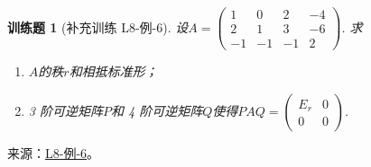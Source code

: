 \documentclass[UTF8,12pt,a4paper,fontset=fandol]{ctexart}
\newtheorem{exercise}{训练题}[section]
\begin{document}
\begin{exercise}[补充训练 L8-例-6]\label{prob:L8-例-6}
设$A=\begin{pmatrix}
            1 & 0 & 2 & -4 \\ 2 & 1 & 3 & -6 \\ -1 & -1 & -1 & 2
        \end{pmatrix}$. 求
    \begin{enumerate}[label=(\arabic*)]
        \item $A$的秩$r$和相抵标准形；

        \item
              3 阶可逆矩阵$P$和 4 阶可逆矩阵$Q$使得$PAQ=\begin{pmatrix}
                      E_r & 0 \\ 0 & 0
                  \end{pmatrix}$.
    \end{enumerate}
\end{exercise}
\noindent 来源：\href{https://github.com/yhwu-is/Linear-Algebra-Left-Undone/blob/new/%E8%AE%B2%E4%B9%89/%E4%B8%93%E9%A2%98/8%20%E7%9B%B8%E6%8A%B5%E6%A0%87%E5%87%86%E5%BD%A2.tex}{L8-例-6}。
\end{document}
